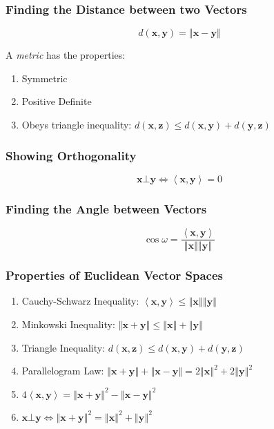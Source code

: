 \documentclass[10pt,twoside,twocolumn]{article}
\begin{document}
\subsubsection{Finding the Distance between two Vectors}

\[
d\left(\mathbf{x},\mathbf{y}\right)=\left\Vert \mathbf{x}-\mathbf{y}\right\Vert 
\]


A \emph{metric} has the properties: 
\begin{enumerate}
\item Symmetric 
\item Positive Definite 
\item Obeys triangle inequality: $d\left(\mathbf{x},\mathbf{z}\right)\leq d\left(\mathbf{x},\mathbf{y}\right)+d\left(\mathbf{y},\mathbf{z}\right)$ 
\end{enumerate}

\subsubsection{Showing Orthogonality}

\[
\mathbf{x}\bot\mathbf{y}\iff\left\langle \mathbf{x},\mathbf{y}\right\rangle =0
\]



\subsubsection{Finding the Angle between Vectors}

\[
\cos\omega=\frac{\left\langle \mathbf{x},\mathbf{y}\right\rangle }{\left\Vert \mathbf{x}\right\Vert \left\Vert \mathbf{y}\right\Vert }
\]



\subsubsection{Properties of Euclidean Vector Spaces}
\begin{enumerate}
\item Cauchy-Schwarz Inequality: $\left\langle \mathbf{x},\mathbf{y}\right\rangle \leq\left\Vert \mathbf{x}\right\Vert \left\Vert \mathbf{y}\right\Vert $ 
\item Minkowski Inequality: $\left\Vert \mathbf{x}+\mathbf{y}\right\Vert \leq\left\Vert \mathbf{x}\right\Vert +\left\Vert \mathbf{y}\right\Vert $ 
\item Triangle Inequality: $d\left(\mathbf{x},\mathbf{z}\right)\leq d\left(\mathbf{x},\mathbf{y}\right)+d\left(\mathbf{y},\mathbf{z}\right)$ 
\item Parallelogram Law: $\left\Vert \mathbf{x}+\mathbf{y}\right\Vert +\left\Vert \mathbf{x}-\mathbf{y}\right\Vert =2\left\Vert \mathbf{x}\right\Vert ^{2}+2\left\Vert \mathbf{y}\right\Vert ^{2}$ 
\item $4\left\langle \mathbf{x},\mathbf{y}\right\rangle =\left\Vert \mathbf{x}+\mathbf{y}\right\Vert ^{2}-\left\Vert \mathbf{x}-\mathbf{y}\right\Vert ^{2}$ 
\item $\mathbf{x}\bot\mathbf{y}\iff\left\Vert \mathbf{x}+\mathbf{y}\right\Vert ^{2}=\left\Vert \mathbf{x}\right\Vert ^{2}+\left\Vert \mathbf{y}\right\Vert ^{2}$ \end{enumerate}
\end{document}
